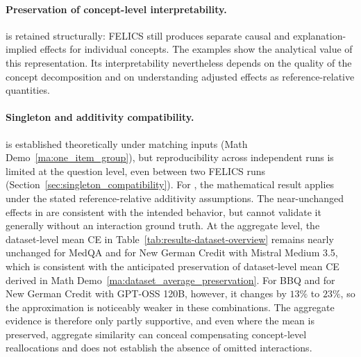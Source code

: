 \paragraph{Preservation of concept-level interpretability.}
 is retained structurally: FELICS still produces separate causal and explanation-implied effects for individual concepts. The examples show the analytical value of this representation. Its interpretability nevertheless depends on the quality of the concept decomposition and on understanding adjusted effects as reference-relative quantities.

\paragraph{Singleton and additivity compatibility.}
 is established theoretically under matching inputs (Math Demo~\ref{ma:one_item_group}), but reproducibility across independent runs is limited at the question level, even between two FELICS runs (Section~\ref{sec:singleton_compatibility}). For , the mathematical result applies under the stated reference-relative additivity assumptions. The near-unchanged effects in  are consistent with the intended behavior, but cannot validate it generally without an interaction ground truth. At the aggregate level, the dataset-level mean CE in Table~\ref{tab:results-dataset-overview} remains nearly unchanged for MedQA and for New German Credit with Mistral Medium 3.5, which is consistent with the anticipated preservation of dataset-level mean CE derived in Math Demo~\ref{ma:dataset_average_preservation}. For BBQ and for New German Credit with GPT-OSS 120B, however, it changes by $13\%$ to $23\%$, so the approximation is noticeably weaker in these combinations. The aggregate evidence is therefore only partly supportive, and even where the mean is preserved, aggregate similarity can conceal compensating concept-level reallocations and does not establish the absence of omitted interactions.

